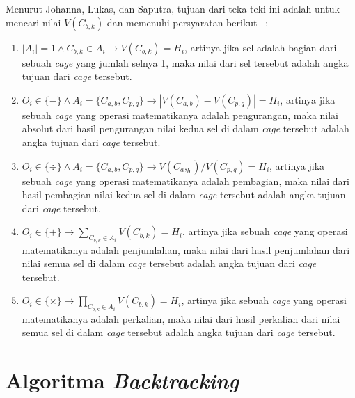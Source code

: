 Menurut Johanna, Lukas, dan Saputra, tujuan dari teka-teki ini adalah untuk mencari nilai \begin{math}V(C_{b,k})\end{math} dan memenuhi persyaratan berikut ~\cite{johanna:12:hybrid}:
\begin{enumerate}
\item \begin{math}|A_i| = 1 \land C_{b,k} \in A_i \rightarrow V(C_{b,k}) = H_i\end{math}, artinya jika sel adalah bagian dari sebuah \textit{cage} yang jumlah selnya 1, maka nilai dari sel tersebut adalah angka tujuan dari \textit{cage} tersebut.
\item \begin{math}O_i \in \{-\} \land A_i = \{C_{a,b}, C_{p,q}\} \rightarrow |V(C_{a,b}) - V(C_{p,q})| = H_i\end{math}, artinya jika sebuah \textit{cage} yang operasi matematikanya adalah pengurangan, maka nilai absolut dari hasil pengurangan nilai kedua sel di dalam \textit{cage} tersebut adalah angka tujuan dari \textit{cage} tersebut.
\item \begin{math}O_i \in \{\div\} \land A_i = \{C_{a,b}, C_{p,q}\} \rightarrow V(C_a,_b) / V(C_{p,q}) = H_i\end{math}, artinya jika sebuah \textit{cage} yang operasi matematikanya adalah pembagian, maka nilai dari hasil pembagian nilai kedua sel di dalam \textit{cage} tersebut adalah angka tujuan dari \textit{cage} tersebut.
\item \begin{math}O_i \in \{+\} \rightarrow \sum_{C_{b,k} \in A_i} V(C_{b,k}) = H_i\end{math}, artinya jika sebuah \textit{cage} yang operasi matematikanya adalah penjumlahan, maka nilai dari hasil penjumlahan dari nilai semua sel di dalam \textit{cage} tersebut adalah angka tujuan dari \textit{cage} tersebut.
\item \begin{math}O_i \in \{\times\} \rightarrow \prod_{C_{b,k} \in A_i} V(C_{b,k}) = H_i\end{math}, artinya jika sebuah \textit{cage} yang operasi matematikanya adalah perkalian, maka nilai dari hasil perkalian dari nilai semua sel di dalam \textit{cage} tersebut adalah angka tujuan dari \textit{cage} tersebut.
\end{enumerate}

\section{Algoritma \textit{Backtracking} ~\cite{fahda:16:backtracking}}
\label{sec:backtracking}

